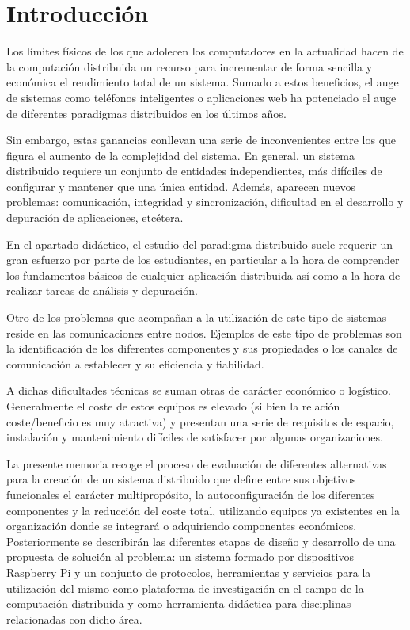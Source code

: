 \chapter{Introducción}

Los límites físicos de los que adolecen los computadores en la actualidad\cite{seth:physical} hacen de la computación distribuida un recurso para incrementar de forma sencilla y económica el rendimiento total de un sistema. Sumado a estos beneficios, el auge de sistemas como teléfonos inteligentes o aplicaciones web ha potenciado el auge de diferentes paradigmas distribuidos en los últimos años. 

Sin embargo, estas ganancias conllevan una serie de inconvenientes entre los que figura el aumento de la complejidad del sistema. En general, un sistema distribuido requiere un conjunto de entidades independientes, más difíciles de configurar y mantener que una única entidad. Además, aparecen nuevos problemas: comunicación, integridad y sincronización, dificultad en el desarrollo y depuración de aplicaciones, etcétera.

En el apartado didáctico, el estudio del paradigma distribuido suele requerir un gran esfuerzo por parte de los estudiantes, en particular a la hora de comprender los fundamentos básicos de cualquier aplicación distribuida así como a la hora de realizar tareas de análisis y depuración.

Otro de los problemas que acompañan a la utilización de este tipo de sistemas reside en las comunicaciones entre nodos. Ejemplos de este tipo de problemas son la identificación de los diferentes componentes y sus propiedades o los canales de comunicación a establecer y su eficiencia y fiabilidad.

A dichas dificultades técnicas se suman otras de carácter económico o logístico. Generalmente el coste de estos equipos es elevado (si bien la relación coste/beneficio es muy atractiva) y presentan una serie de requisitos de espacio, instalación y mantenimiento difíciles de satisfacer por algunas organizaciones.

La presente memoria recoge el proceso de evaluación de diferentes alternativas para la creación de un sistema distribuido que define entre sus objetivos funcionales el carácter multipropósito, la autoconfiguración de los diferentes componentes y la reducción del coste total, utilizando equipos ya existentes en la organización donde se integrará o adquiriendo componentes económicos. Posteriormente se describirán las diferentes etapas de diseño y desarrollo de una propuesta de solución al problema: un sistema formado por dispositivos Raspberry Pi y un conjunto de protocolos, herramientas y servicios para la utilización del mismo como plataforma de investigación en el campo de la computación distribuida y como herramienta didáctica para disciplinas relacionadas con dicho área.

